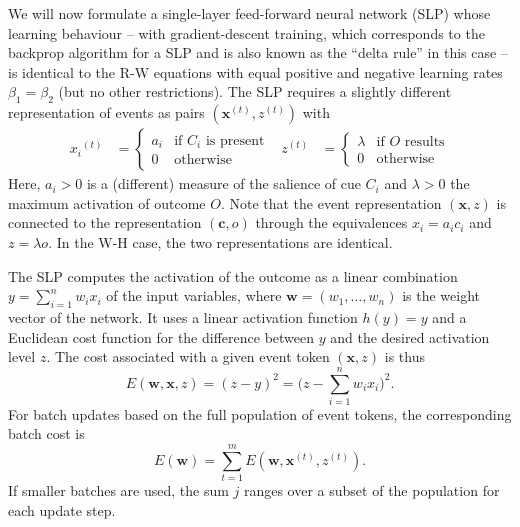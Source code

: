 \documentclass[a4paper,11pt]{article} %
\newcommand{\psup}[1]{\ensuremath{^{(#1)}}}
\newcommand{\psupt}{\psup{t}}
\begin{document}
We will now formulate a single-layer feed-forward neural network (SLP) whose learning behaviour -- with gradient-descent training, which corresponds to the backprop algorithm for a SLP and is also known as the ``delta rule'' in this case -- is identical to the R-W equations with equal positive and negative learning rates $\beta_1 = \beta_2$ (but no other restrictions).  The SLP requires a slightly different representation of events as pairs $(\mathbf{x}\psupt, z\psupt)$ with
\begin{align}
  \label{eq:def-x-z}
  x_i\psupt &= 
  \begin{cases}
    a_i & \text{if $C_i$ is present} \\
    0 & \text{otherwise}
  \end{cases}
  &
  z\psupt &= 
  \begin{cases}
    \lambda & \text{if $O$ results} \\
    0 & \text{otherwise}
  \end{cases}
\end{align} 
Here, $a_i > 0$ is a (different) measure of the salience of cue $C_i$ and $\lambda > 0$ the maximum activation of outcome $O$.  Note that the event representation $(\mathbf{x}, z)$ is connected to the representation $(\mathbf{c}, o)$ through the equivalences $x_i = a_i c_i$ and $z = \lambda o$.  In the W-H case, the two representations are identical.

The SLP computes the activation of the outcome as a linear combination $y = \sum_{i=1}^n w_i x_i$ of the input variables, where $\mathbf{w} = (w_1, \ldots, w_n)$ is the weight vector of the network.  It uses a linear activation function $h(y) = y$ and a Euclidean cost function for the difference between $y$ and the desired activation level $z$.  The cost associated with a given event token $(\mathbf{x}, z)$ is thus
\begin{equation}
  \label{eq:cost-single}
  E(\mathbf{w}, \mathbf{x}, z) = (z - y)^2 = \biggl( z - \sum_{i=1}^n w_i x_i \biggr)^2 .
\end{equation}
For batch updates based on the full population of event tokens, the corresponding batch cost is
\begin{equation}
  \label{eq:cost-batch}
  E(\mathbf{w}) = \sum_{t=1}^m E(\mathbf{w}, \mathbf{x}\psupt, z\psupt) .
\end{equation}
If smaller batches are used, the sum $j$ ranges over a subset of the population for each update step.
\end{document}
